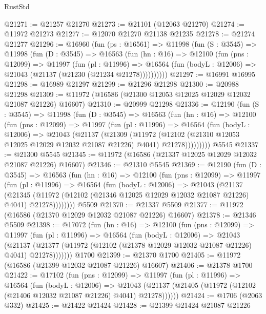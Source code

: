 \begin{lexlean}{RustStd}
\begin{coremodule}
@21271 := @21257 @21270
@21273 := @21101 (@12063 @21270)
@21274 := @11972 @21273
@21277 := @12070 @21270 @21138 @21235
@21278 := @21274 @21277
@21296 := @16960
    (fun (ps : @16561) =>
    @11998
      (fun (S : @3545) =>
      @11998
        (fun (D : @3545) =>
        @16563
          (fun (hn : @16) =>
          @12100
            (fun (pns : @12099) =>
            @11997
              (fun (pl : @11996) =>
              @16564 (fun (bodyL : @12006) => @21043 (@21137 (@21230 (@21234 @21278))))))))))
@21297 := @16991 @16995
@21298 := @16989 @21297
@21299 := @21296 @21298
@21300 := @20988 @21298
@21309 := @11972 (@16586 (@21300 @12053 @12025 @12029 @12032 @21087 @21226) @16607)
@21310 := @20999 @21298
@21336 := @12190
    (fun (S : @3545) =>
    @11998
      (fun (D : @3545) =>
      @16563
        (fun (hn : @16) =>
        @12100
          (fun (pns : @12099) =>
          @11997
            (fun (pl : @11996) =>
            @16564
              (fun (bodyL : @12006) =>
              @21043
                (@21137
                  (@21309
                    (@11972
                      (@12102 (@21310 @12053 @12025 @12029 @12032 @21087 @21226) @4041)
                      @21278)))))))))
    @5545
@21337 := @21300 @5545
@21345 := @11972 (@16586 (@21337 @12025 @12029 @12032 @21087 @21226) @16607)
@21346 := @21310 @5545
@21369 := @12190
    (fun (D : @3545) =>
    @16563
      (fun (hn : @16) =>
      @12100
        (fun (pns : @12099) =>
        @11997
          (fun (pl : @11996) =>
          @16564
            (fun (bodyL : @12006) =>
            @21043
              (@21137
                (@21345
                  (@11972 (@12102 (@21346 @12025 @12029 @12032 @21087 @21226) @4041) @21278))))))))
    @5509
@21370 := @21337 @5509
@21377 := @11972 (@16586 (@21370 @12029 @12032 @21087 @21226) @16607)
@21378 := @21346 @5509
@21398 := @17072
    (fun (hn : @16) =>
    @12100
      (fun (pns : @12099) =>
      @11997
        (fun (pl : @11996) =>
        @16564
          (fun (bodyL : @12006) =>
          @21043
            (@21137
              (@21377 (@11972 (@12102 (@21378 @12029 @12032 @21087 @21226) @4041) @21278)))))))
    @1700
@21399 := @21370 @1700
@21405 := @11972 (@16586 (@21399 @12032 @21087 @21226) @16607)
@21406 := @21378 @1700
@21422 := @17102
    (fun (pns : @12099) =>
    @11997
      (fun (pl : @11996) =>
      @16564
        (fun (bodyL : @12006) =>
        @21043 (@21137 (@21405 (@11972 (@12102 (@21406 @12032 @21087 @21226) @4041) @21278))))))
@21424 := @1706 (@2063 @332)
@21425 := @21422 @21424
@21428 := @21399 @21424 @21087 @21226

\end{coremodule}
\end{lexlean}

